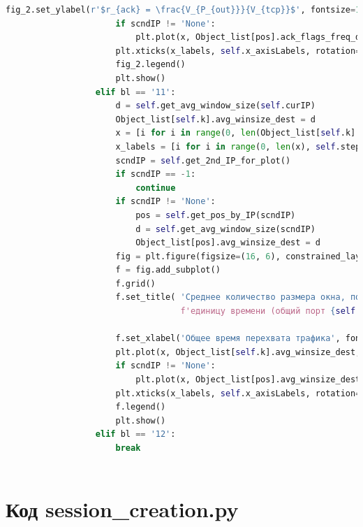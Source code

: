 \documentclass[bachelor, och, coursework]{SCWorks}
\begin{document}
\begin{lstlisting}[language=Python]
                      fig_2.set_ylabel(r'$r_{ack} = \frac{V_{P_{out}}}{V_{tcp}}$', fontsize=15)
                      if scndIP != 'None':
                          plt.plot(x, Object_list[pos].ack_flags_freq_data_src, 'g', label=scndIP)
                      plt.xticks(x_labels, self.x_axisLabels, rotation=30, fontsize=8)
                      fig_2.legend()
                      plt.show()
                  elif bl == '11':
                      d = self.get_avg_window_size(self.curIP)
                      Object_list[self.k].avg_winsize_dest = d
                      x = [i for i in range(0, len(Object_list[self.k].avg_winsize_dest))]
                      x_labels = [i for i in range(0, len(x), self.step)]
                      scndIP = self.get_2nd_IP_for_plot()
                      if scndIP == -1:
                          continue
                      if scndIP != 'None':
                          pos = self.get_pos_by_IP(scndIP)
                          d = self.get_avg_window_size(scndIP)
                          Object_list[pos].avg_winsize_dest = d
                      fig = plt.figure(figsize=(16, 6), constrained_layout=True)
                      f = fig.add_subplot()
                      f.grid()
                      f.set_title( 'Среднее количество размера окна, полученных за ' + \
                                   f'единицу времени (общий порт {self.curPort})', fontsize=15 )
      
                      f.set_xlabel('Общее время перехвата трафика', fontsize=15)
                      plt.plot(x, Object_list[self.k].avg_winsize_dest, label=self.curIP + '(получатель)')
                      if scndIP != 'None':
                          plt.plot(x, Object_list[pos].avg_winsize_dest, label=scndIP + '(получатель)')
                      plt.xticks(x_labels, self.x_axisLabels, rotation=30, fontsize=10)
                      f.legend()
                      plt.show()
                  elif bl == '12':
                      break
      
    \end{lstlisting}

    \section{Код session\_creation.py}
\end{document}
